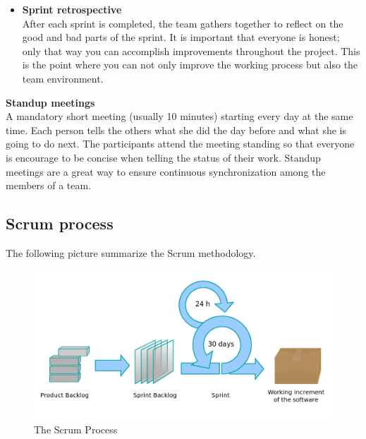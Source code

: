 \begin{itemize}
\item{\textbf{Sprint retrospective}}\\
After each sprint is completed, the team gathers together to reflect on the good and bad parts of the sprint.
It is important that everyone is honest; only that way you can accomplish improvements throughout the project.
This is the point where you can not only improve the working process but also the team environment.
\end{itemize}

\item{\textbf{Standup meetings}}\\
A mandatory short meeting (usually 10 minutes) starting every day at the same time.
Each person tells the others what she did the day before and what she is going to do
next. The participants attend the meeting standing so that everyone is encourage to be concise
when telling the status of their work. Standup meetings are a great way to ensure continuous
synchronization among the members of a team.

\pagebreak

\subsection{Scrum process}
The following picture summarize the Scrum methodology.

\begin{figure}[!h]
\centering
\includegraphics[scale=0.35]{graphics/scrum.png}
\caption{The Scrum Process}\label{fig:scrum_process}
\end{figure}
